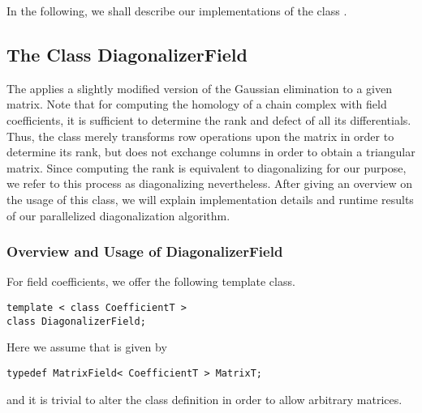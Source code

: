 In the following, we shall describe our implementations of the class .

\subsection{The Class DiagonalizerField}
\label{program:libhomology:DiagonalizerT:DiagonalizerField}

The  applies a slightly modified version of the Gaussian elimination to a given matrix.
Note that for computing the homology of a chain complex with field coefficients,
it is sufficient to determine the rank and defect of all its differentials.
Thus, the class  merely transforms row operations upon the matrix in order to determine its rank,
but does not exchange columns in order to obtain a triangular matrix.
Since computing the rank is equivalent to diagonalizing for our purpose, we refer to this process as diagonalizing nevertheless.
After giving an overview on the usage of this class, we will explain implementation details and runtime results of our parallelized diagonalization algorithm.

\subsubsection{Overview and Usage of DiagonalizerField}

For field coefficients, we offer the following template class.
\begin{lstlisting}
template < class CoefficientT >
class DiagonalizerField;
\end{lstlisting}
Here we assume that  is given by
\begin{lstlisting}
typedef MatrixField< CoefficientT > MatrixT;
\end{lstlisting}
and it is trivial to alter the class definition in order to allow arbitrary matrices.

